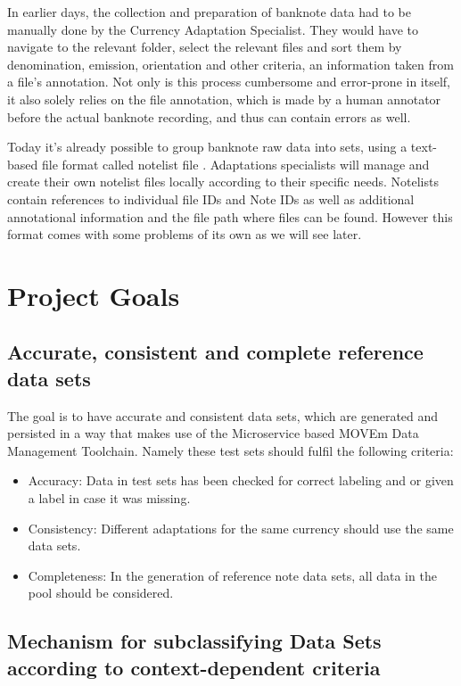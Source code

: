 In earlier days, the collection and preparation of banknote data had to be manually done by the Currency Adaptation Specialist. They would have to navigate to the relevant folder, select the relevant files and sort them by denomination, emission, orientation and other criteria, an information taken from a file's annotation. Not only is this process cumbersome and error-prone in itself, it also solely relies on the file annotation, which is made by a human annotator before the actual banknote recording, and thus can contain errors as well. \par
Today it's already possible to group banknote raw data into sets, using a text-based file format called notelist file . Adaptations specialists will manage and create their own notelist files locally according to their specific needs. Notelists contain references to individual file IDs and Note IDs as well as additional annotational information and the file path where files can be found. However this format comes with some problems of its own as we will see later.\par


\section{Project Goals}
\label{sec:goals}


\subsection{Accurate, consistent and complete reference data sets}
The goal is to have accurate and consistent data sets, which are generated and persisted in a way that makes use of the Microservice based MOVEm Data Management Toolchain. Namely these test sets should fulfil the following criteria:

\begin{itemize}
\item Accuracy: Data in test sets has been checked for correct labeling and or given a label in case it was missing.
\item Consistency: Different adaptations for the same currency should use the same data sets. 
\item Completeness: In the generation of reference note data sets, all data in the pool should be considered.

\end{itemize}




\subsection{Mechanism for subclassifying Data Sets according to context-dependent criteria}

